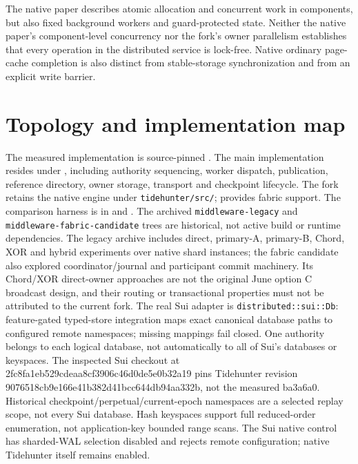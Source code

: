 \documentclass[11pt,a4paper]{article}
\begin{document}
The native paper describes atomic allocation and concurrent work in components, but also fixed background workers and guard-protected state. Neither the native paper's component-level concurrency nor the fork's owner parallelism establishes that every operation in the distributed service is lock-free. Native ordinary page-cache completion is also distinct from stable-storage synchronization and from an explicit write barrier.


\section{Topology and implementation map}\label{sec:topology}
The measured implementation is source-pinned \cite{measuredcode2026}. The main implementation resides under , including authority sequencing, worker dispatch, publication, reference directory, owner storage, transport and checkpoint lifecycle. The fork retains the native engine under \texttt{tidehunter/src/};  provides fabric support. The comparison harness is in  and . The archived \texttt{middleware-legacy} and \texttt{middleware-fabric-candidate} trees are historical, not active build or runtime dependencies. The legacy archive includes direct, primary-A, primary-B, Chord, XOR and hybrid experiments over native shard instances; the fabric candidate also explored coordinator/journal and participant commit machinery. Its Chord/XOR direct-owner approaches are not the original June option C broadcast design, and their routing or transactional properties must not be attributed to the current fork. The real Sui adapter is \texttt{distributed::sui::Db}: feature-gated typed-store integration maps exact canonical database paths to configured remote namespaces; missing mappings fail closed. One authority belongs to each logical database, not automatically to all of Sui's databases or keyspaces. The inspected Sui checkout at 2fc8fa1eb529cdeaa8cf3906c46d0de5e0b32a19 pins Tidehunter revision 9076518c\allowbreak b9e166e4\allowbreak 1b382d41\allowbreak bcc644db\allowbreak 94aa332b, not the measured ba3a6a0. Historical checkpoint/perpetual/current-epoch namespaces are a selected replay scope, not every Sui database. Hash keyspaces support full reduced-order enumeration, not application-key bounded range scans. The Sui native control has sharded-WAL selection disabled and rejects remote configuration; native Tidehunter itself remains enabled.
\end{document}
